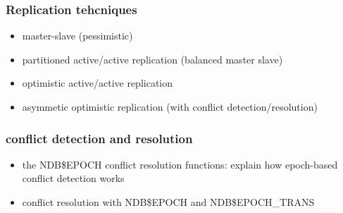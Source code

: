 \subsubsection{Replication tehcniques}
\begin{itemize}
  \item master-slave (pessimistic)
  \item partitioned active/active replication (balanced master slave)
  \item optimistic active/active replication
  \item asymmetic optimistic replication (with conflict detection/resolution)
\end{itemize}

\subsubsection{conflict detection and resolution}
\begin{itemize}
\item the NDB\$EPOCH conflict resolution functions: explain how epoch-based conflict detection works
\item conflict resolution with NDB\$EPOCH and NDB\$EPOCH\_TRANS
\end{itemize}